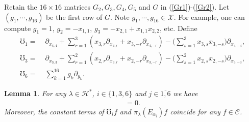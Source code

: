 \documentclass[12pt]{article}
\numberwithin{equation}{section}
\newtheorem{lemma}[theorem]{Lemma}
\theoremstyle{definition}
\theoremstyle{remark}
\begin{document}
Retain the $16\times 16$ matrices $G_2,G_3,G_4,G_5$ and $G$ in (\ref{Gr1})-(\ref{Gr2}). Let $(g_1,\cdots,g_{16})$ be the first row of $G$. Note $g_1,\cdots,g_{16}\in\mathscr{X}$.
For example, one can compute $g_1=1$, $g_2=-x_{1,1}$, $g_3=-x_{2,1}+x_{1,1}x_{2,2}$, etc. Define   
\begin{align}
	\mho_1=&\;\partial_{x_{4,4}}+\sum_{r=1}^{3}(x_{3,r}\partial_{x_{4,r}}+x_{3,-r}\partial_{x_{4,-r}})-\big(\sum_{s=1}^3x_{3,s}x_{3,-s}\big)\partial_{x_{4,-4}},\label{4.51}\\
	\mho_3=&\;\partial_{x_{3,3}}+\sum_{r=1}^{2}(x_{2,r}\partial_{x_{3,r}}+x_{2,-r}\partial_{x_{3,-r}})-\big(\sum_{s=1}^2x_{2,s}x_{2,-s}\big)\partial_{x_{3,-3}},\\
	\mho_6=&\;\sum\limits_{k=1}^{16}g_k\partial_{y_k}.
\end{align}
 \begin{lemma}\label{lem4.8}
 	For any $\lambda\in \mathscr{H}^*$, $i\in\{1,3,6\}$ and $j\in\overline{1,6}$ we have
 	\begin{eqnarray}
 		[\mho_i,\pi_{\lambda}(E_{\alpha_j})]=0. \label{4.54}
 	\end{eqnarray}
 	Moreover, the constant terms of $\mho_if$ and $\pi_{\lambda}(E_{\alpha_i})f$ coincide for any $f\in\mathscr{C}$.
 \end{lemma}  
\end{document}
